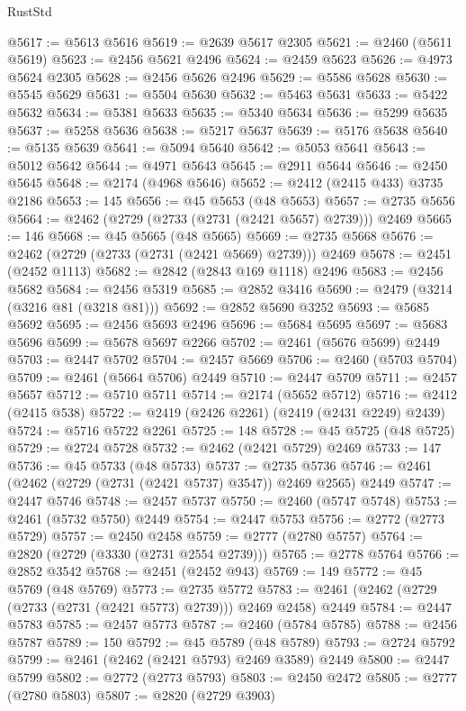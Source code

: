 \begin{lexlean}{RustStd}
\begin{coremodule}
@5617 := @5613 @5616
@5619 := @2639 @5617 @2305
@5621 := @2460 (@5611 @5619)
@5623 := @2456 @5621 @2496
@5624 := @2459 @5623
@5626 := @4973 @5624 @2305
@5628 := @2456 @5626 @2496
@5629 := @5586 @5628
@5630 := @5545 @5629
@5631 := @5504 @5630
@5632 := @5463 @5631
@5633 := @5422 @5632
@5634 := @5381 @5633
@5635 := @5340 @5634
@5636 := @5299 @5635
@5637 := @5258 @5636
@5638 := @5217 @5637
@5639 := @5176 @5638
@5640 := @5135 @5639
@5641 := @5094 @5640
@5642 := @5053 @5641
@5643 := @5012 @5642
@5644 := @4971 @5643
@5645 := @2911 @5644
@5646 := @2450 @5645
@5648 := @2174 (@4968 @5646)
@5652 := @2412 (@2415 @433) @3735 @2186
@5653 := 145
@5656 := @45 @5653 (@48 @5653)
@5657 := @2735 @5656
@5664 := @2462 (@2729 (@2733 (@2731 (@2421 @5657) @2739))) @2469
@5665 := 146
@5668 := @45 @5665 (@48 @5665)
@5669 := @2735 @5668
@5676 := @2462 (@2729 (@2733 (@2731 (@2421 @5669) @2739))) @2469
@5678 := @2451 (@2452 @1113)
@5682 := @2842 (@2843 @169 @1118) @2496
@5683 := @2456 @5682
@5684 := @2456 @5319
@5685 := @2852 @3416
@5690 := @2479 (@3214 (@3216 @81 (@3218 @81)))
@5692 := @2852 @5690 @3252
@5693 := @5685 @5692
@5695 := @2456 @5693 @2496
@5696 := @5684 @5695
@5697 := @5683 @5696
@5699 := @5678 @5697 @2266
@5702 := @2461 (@5676 @5699) @2449
@5703 := @2447 @5702
@5704 := @2457 @5669
@5706 := @2460 (@5703 @5704)
@5709 := @2461 (@5664 @5706) @2449
@5710 := @2447 @5709
@5711 := @2457 @5657
@5712 := @5710 @5711
@5714 := @2174 (@5652 @5712)
@5716 := @2412 (@2415 @538)
@5722 := @2419 (@2426 @2261) (@2419 (@2431 @2249) @2439)
@5724 := @5716 @5722 @2261
@5725 := 148
@5728 := @45 @5725 (@48 @5725)
@5729 := @2724 @5728
@5732 := @2462 (@2421 @5729) @2469
@5733 := 147
@5736 := @45 @5733 (@48 @5733)
@5737 := @2735 @5736
@5746 := @2461 (@2462 (@2729 (@2731 (@2421 @5737) @3547)) @2469 @2565) @2449
@5747 := @2447 @5746
@5748 := @2457 @5737
@5750 := @2460 (@5747 @5748)
@5753 := @2461 (@5732 @5750) @2449
@5754 := @2447 @5753
@5756 := @2772 (@2773 @5729)
@5757 := @2450 @2458
@5759 := @2777 (@2780 @5757)
@5764 := @2820 (@2729 (@3330 (@2731 @2554 @2739)))
@5765 := @2778 @5764
@5766 := @2852 @3542
@5768 := @2451 (@2452 @943)
@5769 := 149
@5772 := @45 @5769 (@48 @5769)
@5773 := @2735 @5772
@5783 := @2461 (@2462 (@2729 (@2733 (@2731 (@2421 @5773) @2739))) @2469 @2458) @2449
@5784 := @2447 @5783
@5785 := @2457 @5773
@5787 := @2460 (@5784 @5785)
@5788 := @2456 @5787
@5789 := 150
@5792 := @45 @5789 (@48 @5789)
@5793 := @2724 @5792
@5799 := @2461 (@2462 (@2421 @5793) @2469 @3589) @2449
@5800 := @2447 @5799
@5802 := @2772 (@2773 @5793)
@5803 := @2450 @2472
@5805 := @2777 (@2780 @5803)
@5807 := @2820 (@2729 @3903)

\end{coremodule}
\end{lexlean}
